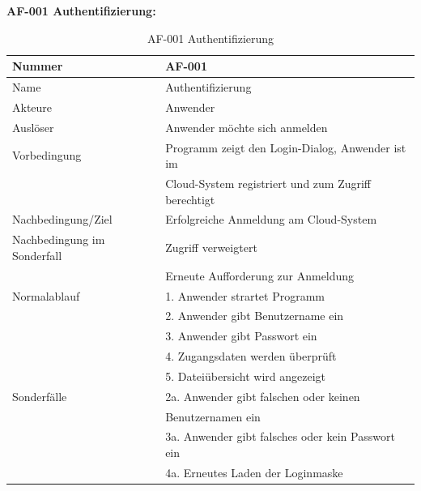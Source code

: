 \documentclass[12pt,a4paper,bibliography=totocnumbered,listof=totocnumbered]{scrartcl}
\begin{document}
\textbf{AF-001 Authentifizierung:}
\begin{table}[!h]
	\centering
	\begin{tabular}{|l|l|}
		\hline
		Nummer & AF-001\\
		\hline
		Name & Authentifizierung\\
		\hline
		Akteure & Anwender\\
		\hline
		Auslöser & Anwender möchte sich anmelden\\
		\hline
		Vorbedingung & Programm zeigt den Login-Dialog, Anwender ist im \\ &  Cloud-System registriert und zum Zugriff berechtigt\\
		\hline
		Nachbedingung/Ziel & Erfolgreiche Anmeldung am Cloud-System \\
		\hline
		Nachbedingung im Sonderfall & Zugriff verweigtert\\ & Erneute Aufforderung zur Anmeldung\\
		\hline
		Normalablauf & 1. Anwender strartet Programm \\ & 2. Anwender gibt Benutzername ein \\ & 3. Anwender gibt Passwort ein \\ & 4. Zugangsdaten werden überprüft \\ & 5. 				Dateiübersicht wird angezeigt \\
		\hline
		Sonderfälle & 2a. Anwender gibt falschen oder keinen \\ & Benutzernamen ein \\ & 3a. Anwender gibt falsches oder kein Passwort ein \\ & 4a. Erneutes Laden der Loginmaske\\
		\hline
	\end{tabular}
	\caption{AF-001 Authentifizierung}
	\label{tab:AF-001 Authentifizierung}
\end{table}
\pagebreak
\end{document}
